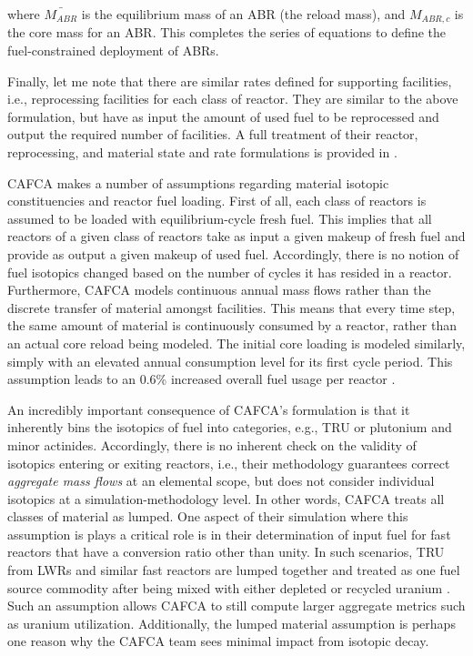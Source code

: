 where $\bar{M_{ABR}}$ is the equilibrium mass of an ABR (the reload mass), and
$M_{ABR,c}$ is the core mass for an ABR. This completes the series of equations
to define the fuel-constrained deployment of ABRs.

Finally, let me note that there are similar rates defined for supporting
facilities, i.e., reprocessing facilities for each class of reactor. They are
similar to the above formulation, but have as input the amount of used fuel to
be reprocessed and output the required number of facilities. A full treatment of
their reactor, reprocessing, and material state and rate formulations is
provided in \cite{busquim_e_silva_system_2008}.

CAFCA makes a number of assumptions regarding material isotopic constituencies
and reactor fuel loading. First of all, each class of reactors is assumed to be
loaded with equilibrium-cycle fresh fuel. This implies that all reactors of a
given class of reactors take as input a given makeup of fresh fuel and provide
as output a given makeup of used fuel. Accordingly, there is no notion of fuel
isotopics changed based on the number of cycles it has resided in a
reactor. Furthermore, CAFCA models continuous annual mass flows rather than the
discrete transfer of material amongst facilities. This means that every time
step, the same amount of material is continuously consumed by a reactor, rather
than an actual core reload being modeled. The initial core loading is modeled
similarly, simply with an elevated annual consumption level for its first cycle
period. This assumption leads to an 0.6\% increased overall fuel usage per
reactor \cite{guerin_impact_2009}.

An incredibly important consequence of CAFCA's formulation is that it inherently
bins the isotopics of fuel into categories, e.g., TRU or plutonium and minor
actinides. Accordingly, there is no inherent check on the validity of isotopics
entering or exiting reactors, i.e., their methodology guarantees
correct \textit{aggregate mass flows} at an elemental scope, but does not
consider individual isotopics at a simulation-methodology level. In other words,
CAFCA treats all classes of material as lumped\cite{guerin_impact_2009}. One
aspect of their simulation where this assumption is plays a critical role is in
their determination of input fuel for fast reactors that have a conversion ratio
other than unity. In such scenarios, TRU from LWRs and similar fast reactors are
lumped together and treated as one fuel source commodity after being mixed with
either depleted or recycled uranium \cite{guerin_impact_2009}. Such an
assumption allows CAFCA to still compute larger aggregate metrics such as
uranium utilization. Additionally, the lumped material assumption is perhaps one
reason why the CAFCA team sees minimal impact from isotopic decay.

